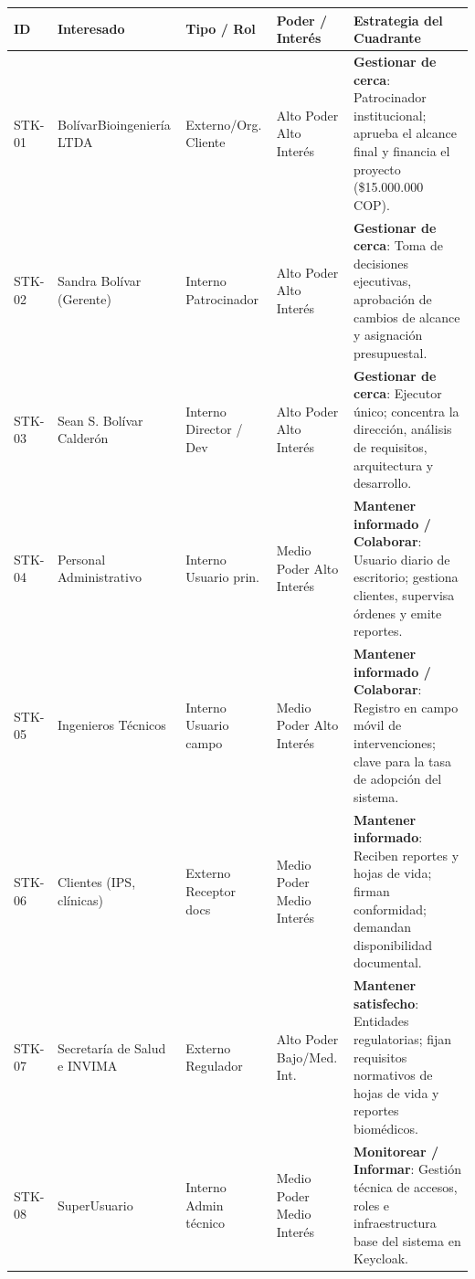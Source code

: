 \documentclass[12pt,varwidth=170mm,border=10pt]{standalone}
\begin{document}
\begingroup
\small
\begin{center}
\begin{tabular}{|C{1.2cm}|L{3.2cm}|L{2.3cm}|L{2.4cm}|L{4.8cm}|}
\hline
\textbf{ID} & \textbf{Interesado} & \textbf{Tipo / Rol} & \textbf{Poder / Interés} & \textbf{Estrategia del Cuadrante} \\
\hline
STK-01 & Bolívar\-Bioingeniería LTDA & Externo/Org. \newline Cliente & Alto Poder \newline Alto Interés & \textbf{Gestionar de cerca}: Patrocinador institucional; aprueba el alcance final y financia el proyecto (\$15.000.000 COP). \\
\hline
STK-02 & Sandra Bolívar (Gerente) & Interno \newline Patrocinador & Alto Poder \newline Alto Interés & \textbf{Gestionar de cerca}: Toma de decisiones ejecutivas, aprobación de cambios de alcance y asignación presupuestal. \\
\hline
STK-03 & Sean S. Bolívar Calderón & Interno \newline Director / Dev & Alto Poder \newline Alto Interés & \textbf{Gestionar de cerca}: Ejecutor único; concentra la dirección, análisis de requisitos, arquitectura y desarrollo. \\
\hline
STK-04 & Personal Administrativo & Interno \newline Usuario prin. & Medio Poder \newline Alto Interés & \textbf{Mantener informado / Colaborar}: Usuario diario de escritorio; gestiona clientes, supervisa órdenes y emite reportes. \\
\hline
STK-05 & Ingenieros Técnicos & Interno \newline Usuario campo & Medio Poder \newline Alto Interés & \textbf{Mantener informado / Colaborar}: Registro en campo móvil de intervenciones; clave para la tasa de adopción del sistema. \\
\hline
STK-06 & Clientes (IPS, clínicas) & Externo \newline Receptor docs & Medio Poder \newline Medio Interés & \textbf{Mantener informado}: Reciben reportes y hojas de vida; firman conformidad; demandan disponibilidad documental. \\
\hline
STK-07 & Secretaría de Salud e INVIMA & Externo \newline Regulador & Alto Poder \newline Bajo/Med. Int. & \textbf{Mantener satisfecho}: Entidades regulatorias; fijan requisitos normativos de hojas de vida y reportes biomédicos. \\
\hline
STK-08 & SuperUsuario & Interno \newline Admin técnico & Medio Poder \newline Medio Interés & \textbf{Monitorear / Informar}: Gestión técnica de accesos, roles e infraestructura base del sistema en Keycloak. \\
\hline
\end{tabular}
\end{center}
\end{document}
